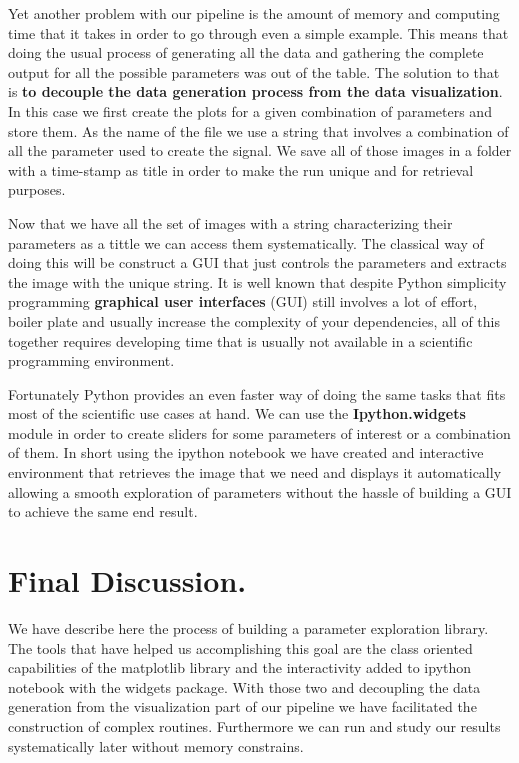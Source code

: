 \documentclass[11pt,a4paper]{article}
\begin{document}
Yet another problem with our pipeline is the amount of memory and
computing time that it takes in order to go through even a simple
example. This means that doing the usual process of generating all the
data and gathering the complete output for all the possible parameters
was out of the table. The solution to that is \textbf{to decouple the
data generation process from the data visualization}. In this case we
first create the plots for a given combination of parameters and store
them. As the name of the file we use a string that involves a
combination of all the parameter used to create the signal. We save all
of those images in a folder with a time-stamp as title in order to make
the run unique and for retrieval purposes.

Now that we have all the set of images with a string characterizing
their parameters as a tittle we can access them systematically. The
classical way of doing this will be construct a GUI that just controls
the parameters and extracts the image with the unique string. It is well known that despite Python simplicity programming \textbf{graphical user interfaces} (GUI) still involves a lot of effort, boiler plate and usually increase the complexity of your  dependencies, all of this together requires developing time that is usually not available in a scientific programming environment.  

Fortunately Python provides an even faster way of doing the same tasks that fits most of the scientific use cases at hand. We can use the \textbf{Ipython.widgets} module in order to create sliders for some parameters of interest or a combination of them. In short using the ipython
notebook we have created and interactive environment that retrieves the
image that we need and displays it automatically allowing a smooth
exploration of parameters without the hassle of building a GUI to achieve the same end result.

\section{Final Discussion.}\label{final-discussion.}

We have describe here the process of building a parameter exploration
library. The tools that have helped us accomplishing this goal are the
class oriented capabilities of the matplotlib library and the
interactivity added to ipython notebook with the widgets package. With
those two and decoupling the data generation from the visualization part of our
pipeline we have facilitated the construction of complex routines. Furthermore we can run and study our results systematically later without memory constrains.
\end{document}
